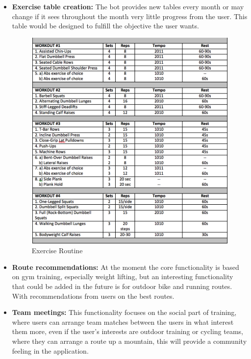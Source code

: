 \begin{itemize}
{\begin{center}
\begin{figure}[h!]
				\label{weight_bfr}
			\end{figure}
		\end{center}
	}
	\item{\textbf{Exercise table creation:} The bot provides new tables every month or may change if it sees throughout the month very little progress from the user. This table would be designed to fulfill the objective the user wants.
		\begin{center}
			\begin{figure}[h!]
				\centering
				\includegraphics[scale=0.3]{./images/4-exercise-routine}
				\caption{Exercise Routine}
				\label{4_exercise_routine}
			\end{figure}
		\end{center}
	}
	\item{\textbf{Route recommendations:} At the moment the core functionality is based on gym training, especially weight lifting, but an interesting functionality that could be added in the future is for outdoor bike and running routes. With recommendations from users on the best routes.}
	\item{\textbf{Team meetings:} This functionality focuses on the social part of training, where users can arrange team matches between the users in what interest them more, even if the user’s interests are outdoor training or cycling teams, where they can arrange a route up a mountain, this will provide a community feeling in the application.}
\end{itemize}

